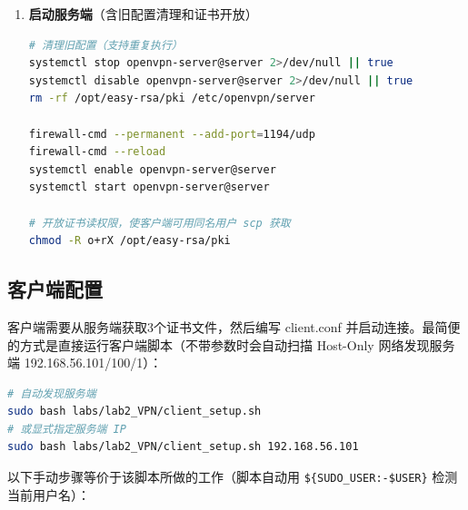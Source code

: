 \documentclass[12pt,a4paper]{ctexart}
\begin{document}
\begin{enumerate}[label=\arabic*.,leftmargin=*]
  \item \textbf{启动服务端}（含旧配置清理和证书开放）

  \begin{cmdbox}
  \begin{lstlisting}[language=bash]
# 清理旧配置（支持重复执行）
systemctl stop openvpn-server@server 2>/dev/null || true
systemctl disable openvpn-server@server 2>/dev/null || true
rm -rf /opt/easy-rsa/pki /etc/openvpn/server

firewall-cmd --permanent --add-port=1194/udp
firewall-cmd --reload
systemctl enable openvpn-server@server
systemctl start openvpn-server@server

# 开放证书读权限，使客户端可用同名用户 scp 获取
chmod -R o+rX /opt/easy-rsa/pki
  \end{lstlisting}
  \end{cmdbox}

\end{enumerate}

\subsection{客户端配置}

客户端需要从服务端获取3个证书文件，然后编写 client.conf 并启动连接。最简便的方式是直接运行客户端脚本（不带参数时会自动扫描 Host-Only 网络发现服务端 192.168.56.101/100/1）：

\begin{cmdbox}
\begin{lstlisting}[language=bash]
# 自动发现服务端
sudo bash labs/lab2_VPN/client_setup.sh
# 或显式指定服务端 IP
sudo bash labs/lab2_VPN/client_setup.sh 192.168.56.101
\end{lstlisting}
\end{cmdbox}

以下手动步骤等价于该脚本所做的工作（脚本自动用 \texttt{\$\{SUDO\_USER:-\$USER\}} 检测当前用户名）：
\end{document}
